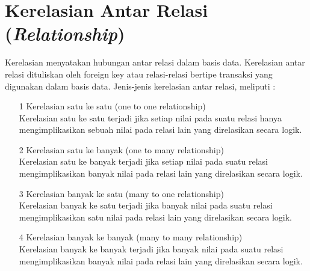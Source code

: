 \documentclass{jtetiproposalskripsi}
\begin{document}
\section{Kerelasian Antar Relasi (\textit{Relationship})}
Kerelasian menyatakan hubungan antar relasi dalam basis data. Kerelasian antar relasi dituliskan oleh foreign key atau relasi-relasi bertipe transaksi yang digunakan dalam basis data. Jenis-jenis kerelasian antar relasi, meliputi :
\begin{itemize}
\item[1]Kerelasian satu ke satu (one to one relationship)
\\
Kerelasian satu ke satu terjadi jika setiap nilai pada suatu relasi hanya mengimplikasikan sebuah nilai pada relasi lain yang direlasikan secara logik.
\item[2]Kerelasian satu ke banyak (one to many relationship)
\\
Kerelasian satu ke banyak terjadi jika setiap nilai pada suatu relasi mengimplikasikan banyak nilai pada relasi lain yang direlasikan secara logik.
\item[3]Kerelasian banyak ke satu (many to one relationship)
\\
Kerelasian banyak ke satu terjadi jika banyak nilai pada suatu relasi mengimplikasikan satu nilai pada relasi lain yang direlasikan secara logik.
\item[4]Kerelasian banyak ke banyak (many to many relationship)
\\
Kerelasian banyak ke banyak terjadi jika banyak nilai pada suatu relasi mengimplikasikan banyak nilai pada relasi lain yang direlasikan secara logik.
\end{itemize}
\end{document}
